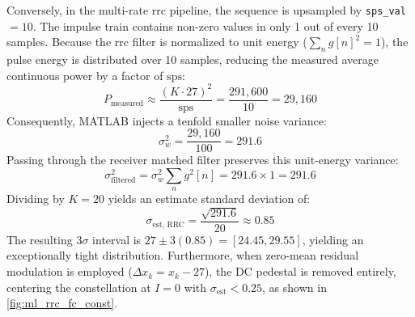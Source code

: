 \documentclass[Markos_Delaportas_1316.tex]{subfiles}
\begin{document}
Conversely, in the multi-rate \gls{rrc} pipeline, the sequence is
upsampled by \texttt{sps\_val} $= 10$. The impulse train contains
non-zero values in only 1 out of every 10 samples. Because the
\gls{rrc} filter is normalized to unit energy ($\sum_n g[n]^2 = 1$),
the pulse energy is distributed over 10 samples, reducing the
measured average continuous power by a factor of $\text{sps}$:
\begin{equation}
    P_{\text{measured}} \approx \frac{(K \cdot 27)^2}{\text{sps}} =
    \frac{291{,}600}{10} = 29{,}160
    \label{eq:filtered_measured_power}
\end{equation}
Consequently, MATLAB injects a tenfold smaller noise variance:
\begin{equation}
    \sigma_w^2 = \frac{29{,}160}{100} = 291.6
    \label{eq:filtered_noise_variance}
\end{equation}
Passing through the receiver matched filter preserves this unit-energy variance:
\begin{equation}
    \sigma_{\text{filtered}}^2 = \sigma_w^2 \sum_{n} g^2[n] = 291.6
    \times 1 = 291.6
    \label{eq:matched_filter_noise_out}
\end{equation}
Dividing by $K = 20$ yields an estimate standard deviation of:
\begin{equation}
    \sigma_{\text{est, RRC}} = \frac{\sqrt{291.6}}{20} \approx 0.85
    \label{eq:filtered_average_deviation}
\end{equation}
The resulting $3\sigma$ interval is $27 \pm 3(0.85) = [24.45,
29.55]$, yielding an exceptionally tight distribution. Furthermore,
when zero-mean residual modulation is employed ($\Delta x_k = x_k -
27$), the DC pedestal is removed entirely, centering the
constellation at $I = 0$ with $\sigma_{\text{est}} < 0.25$, as shown
in \cref{fig:ml_rrc_fc_const}.
\end{document}

